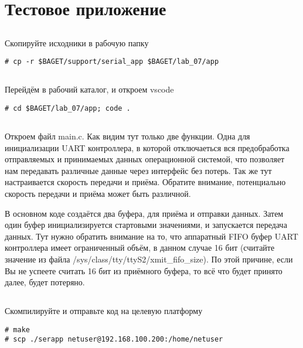 \section{Тестовое приложение}

\subsection{}Скопируйте исходники в рабочую папку
\begin{lstlisting}[style=bash]
# cp -r $BAGET/support/serial_app $BAGET/lab_07/app
\end{lstlisting}

\subsection{}Перейдём в рабочий каталог, и откроем vscode
\begin{lstlisting}[style=bash]
# cd $BAGET/lab_07/app; code .
\end{lstlisting}

\subsection{}Откроем файл main.c. Как видим тут только две функции. Одна для инициализации UART контроллера, в которой отключаеться вся предобработка отправляемых и принимаемых данных операционной системой, что позволяет нам передавать различные данные через интерфейс без потерь. Так же тут настраивается скорость передачи и приёма. Обратите внимание, потенциально скорость передачи и приёма может быть различной.

В основном коде создаётся два буфера, для приёма и отправки данных. Затем один буфер инициализируется стартовыми значениями, и запускается передача данных. Тут нужно обратить внимание на то, что аппаратный FIFO буфер UART контроллера имеет ограниченный объём, в данном случае 16 бит (считайте значение из файла /sys/class/tty/ttyS2/xmit\_fifo\_size). По этой причине, если Вы не успеете считать 16 бит из приёмного буфера, то всё что будет принято далее, будет потеряно.

\subsection{}Скомпилируйте и отправьте код на целевую платформу
\begin{lstlisting}[style=bash]
# make
# scp ./serapp netuser@192.168.100.200:/home/netuser
\end{lstlisting}


